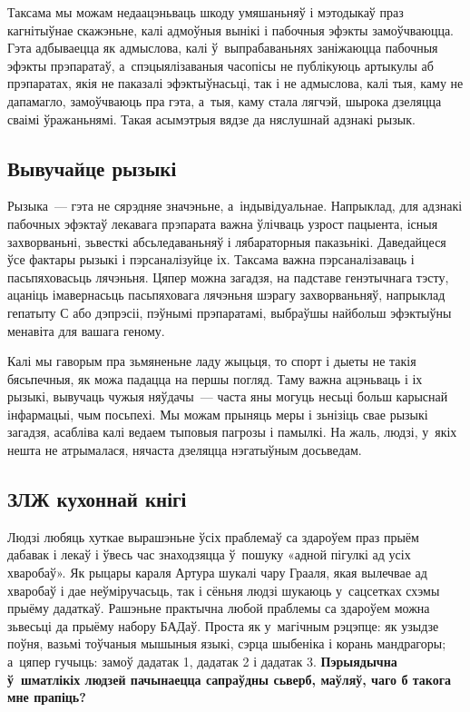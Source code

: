 Таксама мы можам недаацэньваць шкоду умяшаньняў і мэтодыкаў праз кагнітыўнае скажэньне, калі адмоўныя вынікі і пабочныя эфэкты замоўчваюцца. Гэта адбываецца як адмыслова, калі ў~выпрабаваньнях заніжаюцца пабочныя эфэкты прэпаратаў, а~спэцыялізаваныя часопісы не публікуюць артыкулы аб прэпаратах, якія не паказалі эфэктыўнасьці, так і не адмыслова, калі тыя, каму не дапамагло, замоўчваюць пра гэта, а~тыя, каму стала лягчэй, шырока дзеляцца сваімі ўражаньнямі. Такая асымэтрыя вядзе да няслушнай адзнакі рызык.

\subsection*{Вывучайце рызыкі}

Рызыка~--- гэта не сярэдняе значэньне, а~індывідуальнае. Напрыклад, для адзнакі пабочных эфэктаў лекавага прэпарата важна ўлічваць узрост пацыента, існыя захворваньні, зьвесткі абсьледаваньняў і лябараторныя паказьнікі. Даведайцеся ўсе фактары рызыкі і пэрсаналізуйце іх. Таксама важна пэрсаналізаваць і пасьпяховасьць лячэньня. Цяпер можна загадзя, на падставе генэтычнага тэсту, ацаніць імавернасьць пасьпяховага лячэньня шэрагу захворваньняў, напрыклад гепатыту С або дэпрэсіі, пэўнымі прэпаратамі, выбраўшы найбольш эфэктыўны менавіта для вашага геному.

Калі мы гаворым пра зьмяненьне ладу жыцьця, то спорт і дыеты не такія бясьпечныя, як можа падацца на першы погляд. Таму важна ацэньваць і іх рызыкі, вывучаць чужыя няўдачы~--- часта яны могуць несьці больш карыснай інфармацыі, чым посьпехі. Мы можам прыняць меры і зьнізіць свае рызыкі загадзя, асабліва калі ведаем тыповыя пагрозы і памылкі. На жаль, людзі, у~якіх нешта не атрымалася, нячаста дзеляцца нэгатыўным досьведам.

\subsection*{ЗЛЖ кухоннай кнігі}

Людзі любяць хуткае вырашэньне ўсіх праблемаў са здароўем праз прыём дабавак і лекаў і ўвесь час знаходзяцца ў~пошуку «адной пігулкі ад усіх хваробаў». Як рыцары караля Артура шукалі чару Грааля, якая вылечвае ад хваробаў і дае неўміручасьць, так і сёньня людзі шукаюць у~сацсетках схэмы прыёму дадаткаў. Рашэньне практычна любой праблемы са здароўем можна зьвесьці да прыёму набору БАДаў. Проста як у~магічным рэцэпце: як узыдзе поўня, вазьмі тоўчаныя мышыныя языкі, сэрца шыбеніка і корань мандрагоры; а~цяпер гучыць: замоў дадатак 1, дадатак 2 і дадатак 3. \textbf{Пэрыядычна ў~шматлікіх людзей пачынаецца сапраўдны сьверб, маўляў, чаго б такога мне прапіць?}

